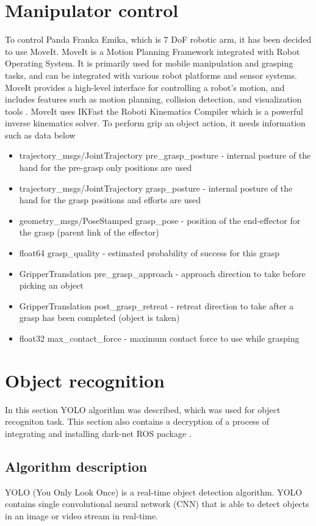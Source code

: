 \documentclass[conference,a4paper]{IEEEtran}
\begin{document}
\section{Manipulator control}
To control Panda Franka Emika, which is 7 DoF robotic arm, it has been decided to use MoveIt. MoveIt is a Motion Planning Framework integrated with Robot Operating System. It is primarily used for mobile manipulation and grasping tasks, and can be integrated with various robot platforms and sensor systems. MoveIt provides a high-level interface for controlling a robot's motion, and includes features such as motion planning, collision detection, and visualization tools \cite{MOVEIT}.
MoveIt uses IKFast the Roboti Kinematics Compiler which is a powerful inverse kinematics solver. To perform grip an object action, it needs information such as 
data below \cite{grapsmessage}
\begin{itemize}
  \item trajectory\_msgs/JointTrajectory pre\_grasp\_posture - internal posture of the hand for the pre-grasp only positions are used
  \item trajectory\_msgs/JointTrajectory grasp\_posture - internal posture of the hand for the grasp
  positions and efforts are used
  \item geometry\_msgs/PoseStamped grasp\_pose - position of the end-effector for the grasp (parent link of the effector)
  \item float64 grasp\_quality - estimated probability of success for this grasp
  \item GripperTranslation pre\_grasp\_approach - approach direction to take before picking an object
  \item GripperTranslation post\_grasp\_retreat - retreat direction to take after a grasp has been completed (object is taken)
  \item float32 max\_contact\_force - maximum contact force to use while grasping
\end{itemize} 

\section{Object recognition}
In this section YOLO algorithm was described, which was used for object recogniton task. This section also contains a decryption of a process of integrating and installing dark-net ROS package \cite{YOLO_ROS}.

\subsection{Algorithm description}
YOLO (You Only Look Once) is a real-time object detection algorithm. YOLO contains single convolutional neural network (CNN) that is able to detect objects in an image or video stream in real-time. 
\end{document}
